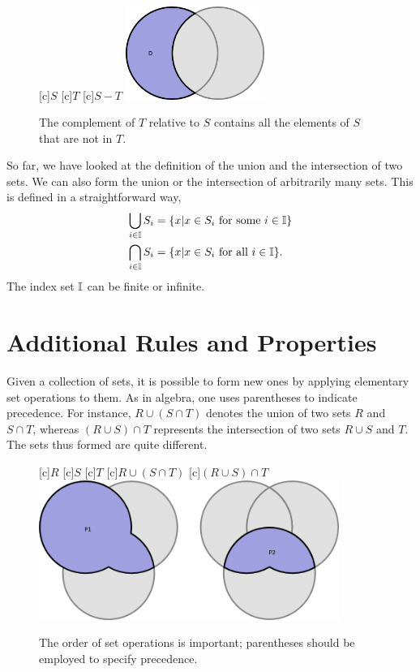 \begin{figure}[htb]
\begin{center}
\begin{psfrags}
[c]{$S$}
[c]{$T$}
[c]{$S - T$}
\includegraphics[height=3.03cm]{Figures/1Chapter/difference}
\end{psfrags}
\caption{The complement of $T$ relative to $S$ contains all the elements of $S$ that are not in $T$.}
\end{center}
\end{figure}

So far, we have looked at the definition of the union and the intersection of two sets.
We can also form the union or the intersection of arbitrarily many sets.
This is defined in a straightforward way,
\begin{align*}
\bigcup_{i \in \mathbb{I}} S_{i}
&= \{ x | x \in S_{i} \text{ for some } i \in \mathbb{I} \} \\
\bigcap_{i \in \mathbb{I}} S_{i}
&= \{ x | x \in S_{i} \text{ for all } i \in \mathbb{I} \} .
\end{align*}
The index set $\mathbb{I}$ can be finite or infinite.


\section{Additional Rules and Properties}

Given a collection of sets, it is possible to form new ones by applying elementary set operations to them.
As in algebra, one uses parentheses to indicate precedence.
For instance, $R \cup (S \cap T)$ denotes the union of two sets $R$ and $S \cap T$, whereas $(R \cup S) \cap T$ represents the intersection of two sets $R \cup S$ and $T$.
The sets thus formed are quite different.

\begin{figure}[htb]
\begin{center}
\begin{psfrags}
[c]{$R$}
[c]{$S$}
[c]{$T$}
[c]{$R \cup (S \cap T)$}
[c]{$(R \cup S) \cap T$}
\includegraphics[height=4.55cm]{Figures/1Chapter/triple}
\end{psfrags}
\caption{The order of set operations is important; parentheses should be employed to specify precedence.}
\end{center}
\end{figure}

